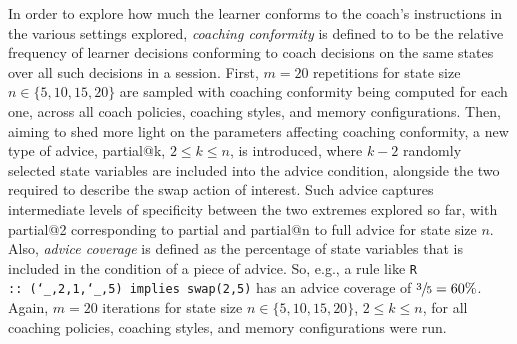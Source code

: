 \documentclass[a4paper,twoside]{article}
\makeatletter
\newcommand{\ttus}{\char`_}
\newcommand{\partialadvice}[1]{partial@{#1}}
\makeatother
\begin{document}
In order to explore how much the learner conforms to the coach's instructions in the various settings explored, \emph{coaching conformity} is defined to to be the relative frequency of learner decisions conforming to coach decisions on the same states over all such decisions in a session. First, $m=20$ repetitions for state size $n\in\{5,10,15,20\}$ are sampled with coaching conformity being computed for each one, across all coach policies, coaching styles, and memory configurations. Then, aiming to shed more light on the parameters affecting coaching conformity, a new type of advice, \partialadvice{k}, $2\leq k\leq n$, is introduced, where $k-2$ randomly selected state variables are included into the advice condition, alongside the two required to describe the swap action of interest. Such advice captures intermediate levels of specificity between the two extremes explored so far, with \partialadvice{2} corresponding to partial and \partialadvice{n} to full advice for state size $n$. Also, \emph{advice coverage} is defined as the percentage of state variables that is included in the condition of a piece of advice. So, e.g., a rule like \texttt{R ::~(\ttus,2,1,\ttus,5) implies swap(2,5)} has an advice coverage of $\sfrac{3}{5}=60\%$. Again, $m=20$ iterations for state size $n\in\{5,10,15,20\}$, $2\leq k\leq n$, for all coaching policies, coaching styles, and memory configurations were run.
\end{document}
